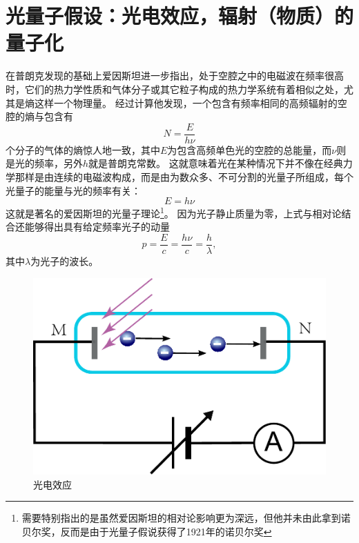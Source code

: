 \section{光量子假设：光电效应，辐射（物质）的量子化}
在普朗克发现的基础上爱因斯坦进一步指出，处于空腔之中的电磁波在频率很高时，它们的热力学性质和气体分子或其它粒子构成的热力学系统有着相似之处，尤其是熵这样一个物理量。
经过计算他发现，一个包含有频率相同的高频辐射的空腔的熵与包含有
\begin{equation}
N=\frac{E}{h\nu}
\end{equation}
个分子的气体的熵惊人地一致，其中$E$为包含高频单色光的空腔的总能量，而$\nu$则是光的频率，另外$h$就是普朗克常数。
这就意味着光在某种情况下并不像在经典力学那样是由连续的电磁波构成，而是由为数众多、不可分割的光量子所组成，每个光量子的能量与光的频率有关：
\begin{equation}
E=h\nu
\end{equation}
这就是著名的爱因斯坦的光量子理论\footnote{需要特别指出的是虽然爱因斯坦的相对论影响更为深远，但他并未由此拿到诺贝尔奖，反而是由于光量子假说获得了1921年的诺贝尔奖}。
因为光子静止质量为零，上式与相对论结合还能够得出具有给定频率光子的动量
\begin{equation}
p = \frac{E}{c} = \frac{h\nu}{c} = \frac{h}{\lambda},
\end{equation}
其中$\lambda$为光子的波长。


\begin{figure}[ht]
\centering
\includegraphics[width=0.6\linewidth]{images/particle-8}
\caption{光电效应}
\label{fig:particle-8}
\end{figure}

